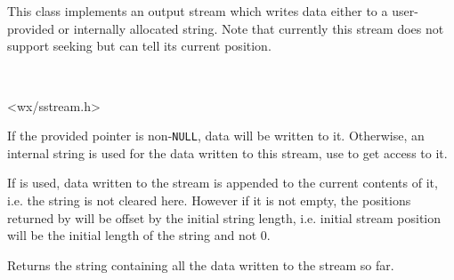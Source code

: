 
\section{}\label{wxstringoutputstream}

This class implements an output stream which writes data either to a
user-provided or internally allocated string. Note that currently this stream
does not support seeking but can tell its current position.


\\


<wx/sstream.h>





\label{wxstringoutputstreamctor}


If the provided pointer is non-\texttt{NULL}, data will be written to it.
Otherwise, an internal string is used for the data written to this stream, use 
 to get access to it.

If  is used, data written to the stream is appended to the current
contents of it, i.e. the string is not cleared here. However if it is not
empty, the positions returned by  will be
offset by the initial string length, i.e. initial stream position will be the
initial length of the string and not $0$.


\label{wxstringoutputstreamgetstring}


Returns the string containing all the data written to the stream so far.

